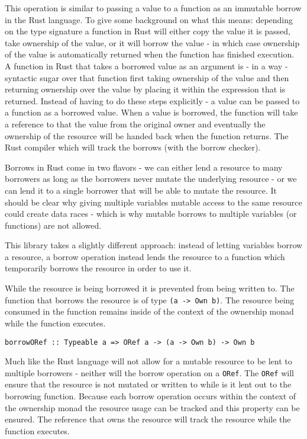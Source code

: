 \documentclass[onehalf,11pt]{beavtex}
\begin{document}
This operation is similar to passing a value to a function as an immutable
borrow in the Rust language.  To give some background on what this means:
depending on the type signature a function in Rust will either copy the value
it is passed, take ownership of the value, or it will borrow the value - in
which case ownership of the value is automatically returned when the function
has finished execution.\cite{rust_book_ownership}
A function in Rust that takes a borrowed value as an argument is - in a way -
syntactic sugar over that function first taking ownership of the value and then
returning ownership over the value by placing it within the expression that is
returned.
Instead of having to do these steps explicitly - a value can be passed to a
function as a borrowed value.  When a value is borrowed, the function will take
a reference to that the value from the original owner and eventually the
ownership of the resource will be handed back when the function returns.
The Rust compiler which will track the borrows (with the borrow checker).

Borrows in Rust come in two flavors - we can either lend a resource to many
borrowers as long as the borrowers never mutate the underlying resource - or we
can lend it to a single borrower that will be able to mutate the
resource.\cite{rust_book_borrowing}
It should be clear why giving multiple variables mutable access to
the same resource could create data races - which is why mutable borrows to
multiple variables (or functions) are not allowed.

This library takes a slightly different approach: instead of letting variables
borrow a resource, a borrow operation instead lends the resource to a function
which temporarily borrows the resource in order to use it.

While the resource is being borrowed it is prevented from being written to.
The function that borrows the resource is of type \texttt{(a -> Own b)}. The
resource being consumed in the function remains inside of the context of the
ownership monad while the function executes.

\begin{verbatim}
borrowORef :: Typeable a => ORef a -> (a -> Own b) -> Own b
\end{verbatim}

Much like the Rust language will not allow for a mutable resource to be lent to
multiple borrowers - neither will the borrow operation on a \texttt{ORef}.
The \texttt{ORef} will ensure that the resource is not mutated or written to while is it
lent out to the borrowing function. 
Because each borrow operation occurs within the context of the ownership monad
the resource usage can be tracked and this property can be ensured. The
reference that owns the resource will track the resource while the function
executes.
\end{document}
